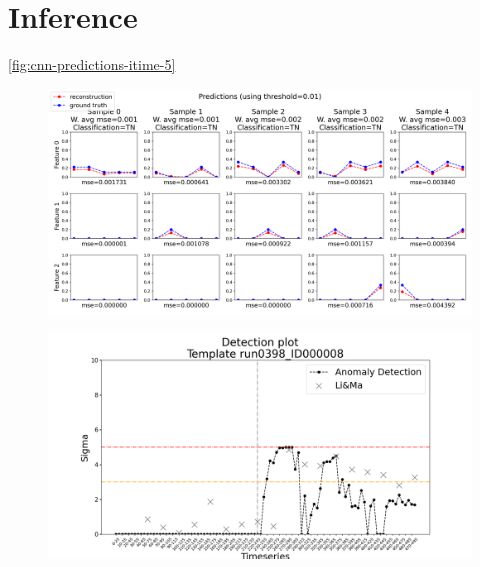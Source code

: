 
\section{Inference}
\label{ss:inference}

\autoref{fig:cnn-predictions-itime-5}

\begin{figure}[!htb]
\centering
\includegraphics[width=\linewidth]{figures/training/cnn_epoch_5_plot_0_predictions_itime_5.png}
\caption{ }
\label{fig:cnn-predictions-itime-5}
\end{figure}

\begin{figure}[!htb]
\centering
\includegraphics[width=\linewidth]{figures/experiments/detection_plots/detection_plot_run0398_ID000008_testset_e.png}
\caption{ }
\label{fig:detection_plot}
\end{figure}



